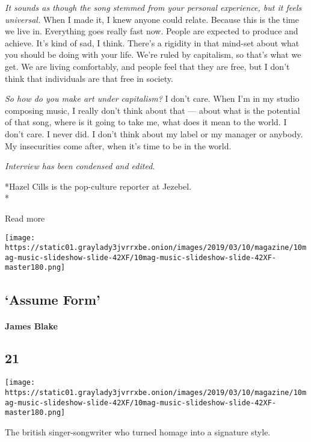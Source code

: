 \emph{It sounds as though the song stemmed from your personal
experience, but it feels universal.} When I made it, I knew anyone could
relate. Because this is the time we live in. Everything goes really fast
now. People are expected to produce and achieve. It's kind of sad, I
think. There's a rigidity in that mind-set about what you should be
doing with your life. We're ruled by capitalism, so that's what we get.
We are living comfortably, and people feel that they are free, but I
don't think that individuals are that free in society.

\emph{So how do you make art under capitalism?} I don't care. When I'm
in my studio composing music, I really don't think about that --- about
what is the potential of that song, where is it going to take me, what
does it mean to the world. I don't care. I never did. I don't think
about my label or my manager or anybody. My insecurities come after,
when it's time to be in the world.

\emph{Interview has been condensed and edited.}

*Hazel Cills is the pop-culture reporter at Jezebel.\\
*

Read more

\texttt{[image: https://static01.graylady3jvrrxbe.onion/images/2019/03/10/magazine/10mag-music-slideshow-slide-42XF/10mag-music-slideshow-slide-42XF-master180.png]}

\hypertarget{--assume-form}{%
\subsection{\texorpdfstring{ `Assume
Form'}{  `Assume Form'}}\label{--assume-form}}

\hypertarget{james-blake}{%
\paragraph{James Blake}\label{james-blake}}

\hypertarget{21}{%
\subsection{21}\label{21}}

\texttt{[image: https://static01.graylady3jvrrxbe.onion/images/2019/03/10/magazine/10mag-music-slideshow-slide-42XF/10mag-music-slideshow-slide-42XF-master180.png]}

The british singer-songwriter who turned homage into a signature style.

